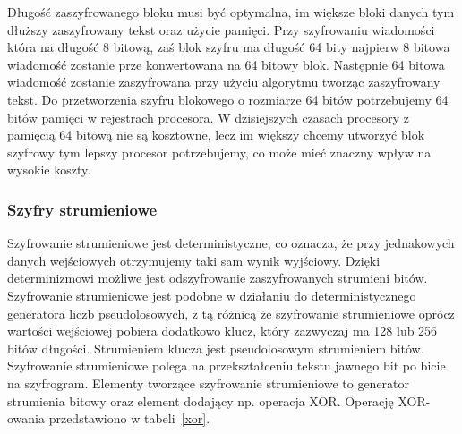 \documentclass[12p]{article}
\begin{document}
\quad Długość zaszyfrowanego bloku musi być optymalna, im większe bloki danych tym dłuższy zaszyfrowany tekst oraz użycie pamięci. Przy szyfrowaniu wiadomości która na długość 8 bitową, zaś blok szyfru ma długość 64 bity najpierw 8 bitowa wiadomość zostanie prze konwertowana na 64 bitowy blok. Następnie 64 bitowa wiadomość zostanie zaszyfrowana przy użyciu algorytmu tworząc zaszyfrowany tekst. Do przetworzenia szyfru blokowego o rozmiarze 64 bitów potrzebujemy 64 bitów pamięci w rejestrach procesora. W dzisiejszych czasach procesory z pamięcią 64 bitową nie są kosztowne, lecz im większy chcemy utworzyć blok szyfrowy tym lepszy procesor potrzebujemy, co może mieć znaczny wpływ na wysokie koszty.

\subsubsection{Szyfry strumieniowe}
\quad Szyfrowanie strumieniowe jest deterministyczne, co oznacza, że przy jednakowych danych wejściowych otrzymujemy taki sam wynik wyjściowy. Dzięki determinizmowi możliwe jest odszyfrowanie zaszyfrowanych strumieni bitów.  Szyfrowanie strumieniowe jest podobne w działaniu do deterministycznego generatora liczb pseudolosowych, z tą różnicą że szyfrowanie strumieniowe oprócz wartości wejściowej pobiera dodatkowo klucz, który zazwyczaj ma 128 lub 256 bitów długości. Strumieniem klucza jest pseudolosowym strumieniem bitów. Szyfrowanie strumieniowe polega na przekształceniu tekstu jawnego bit po bicie na szyfrogram. Elementy tworzące szyfrowanie strumieniowe to generator strumienia bitowy oraz element dodający np. operacja XOR. Operację XOR-owania przedstawiono w tabeli~\ref{xor}.
\end{document}
